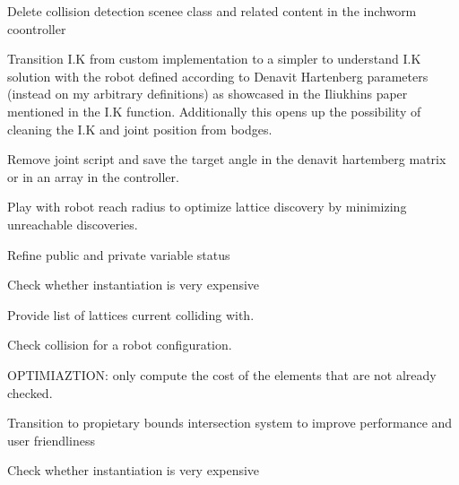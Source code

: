 
\begin{DoxyRefList}
\item[Class \mbox{\hyperlink{class_illa_controller_v3}{Illa\+Controller\+V3}} ]\label{todo__todo000001}%
%
Delete collision detection scenee class and related content in the inchworm coontroller 



Transition I.\+K from custom implementation to a simpler to understand I.\+K solution with the robot defined according to Denavit Hartenberg parameters (instead on my arbitrary definitions) as showcased in the Iliukhin\textquotesingle{}s paper mentioned in the I.\+K function. Additionally this opens up the possibility of cleaning the I.\+K and joint position from bodges. 



Remove joint script and save the target angle in the denavit hartemberg matrix or in an array in the controller. 



Play with robot reach radius to optimize lattice discovery by minimizing unreachable discoveries. 



Refine public and private variable status  
\item[Member \mbox{\hyperlink{class_illa_controller_v3_a8cf1cf2655a3174e928f8b3f161a4b2f}{Illa\+Controller\+V3.Is\+Pose\+Colliding}} (\mbox{\hyperlink{class_pos_j}{PosJ}} Pose\+To\+Check)]\label{todo__todo000002}%
%
Check whether instantiation is very expensive

\label{todo__todo000003}%
%
Provide list of lattices current colliding with.

\label{todo__todo000004}%
%
Check collision for a robot configuration.  
\item[Member \mbox{\hyperlink{class_illa_graph_node_a536aace3c5276651d6870f318f897e02}{Illa\+Graph\+Node.Order\+Dictionary\+Reach\+From\+Origin}} ()]\label{todo__todo000008}%
%
OPTIMIAZTION\+: only compute the cost of the elements that are not already checked.  
\item[Class \mbox{\hyperlink{class_illa_node_sensor_script}{Illa\+Node\+Sensor\+Script}} ]\label{todo__todo000009}%
%
Transition to propietary bounds intersection system to improve performance and user friendliness  
\item[Member \mbox{\hyperlink{class_inchworm_robot_controller_a434da4643498bd898d99a63678492ae4}{Inchworm\+Robot\+Controller.Is\+Pose\+Colliding}} (\mbox{\hyperlink{class_pos_j}{PosJ}} Pose\+To\+Check)]\label{todo__todo000010}%
%
Check whether instantiation is very expensive


\end{DoxyRefList}
